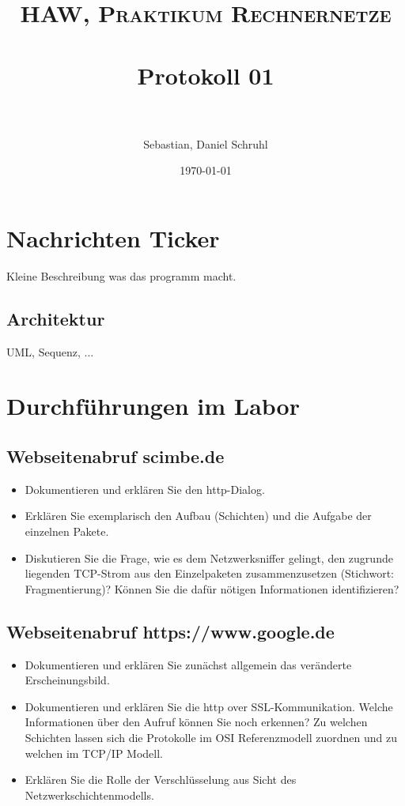 \documentclass[paper=a4, fontsize=11pt]{scrreprt}
\title{	
	\normalfont \normalsize 
	\textsc{HAW, Praktikum Rechnernetze} \\ [25pt] 
	\horrule{0.5pt} \\[0.4cm]
	\huge Protokoll 01 \\
	\horrule{2pt} \\[0.5cm]
}
\author{Sebastian, Daniel Schruhl}
\date{\normalsize\today}
\numberwithin{equation}{section}
\numberwithin{figure}{section}
\numberwithin{table}{section}
\begin{document}
\maketitle

\section{Nachrichten Ticker}

Kleine Beschreibung was das programm macht.

\subsection{Architektur}

UML, Sequenz, ...

\section{Durchführungen im Labor}

\subsection{Webseitenabruf scimbe.de}

\begin{itemize}
	\item Dokumentieren und erklären Sie den http-Dialog.
    \item Erklären Sie exemplarisch den Aufbau (Schichten) und die Aufgabe der einzelnen Pakete.
    \item Diskutieren Sie die Frage, wie es dem Netzwerksniffer gelingt, den zugrunde liegenden TCP-Strom aus den Einzelpaketen zusammenzusetzen (Stichwort: Fragmentierung)? Können Sie die dafür nötigen Informationen identifizieren?
\end{itemize}

\subsection{Webseitenabruf https://www.google.de}

\begin{itemize}
	\item Dokumentieren und erklären Sie zunächst allgemein das veränderte Erscheinungsbild.
	\item Dokumentieren und erklären Sie die http over SSL-Kommunikation. Welche Informationen über den
Aufruf können Sie noch erkennen? Zu welchen Schichten lassen sich die Protokolle im OSI
Referenzmodell zuordnen und zu welchen im TCP/IP Modell.
	\item Erklären Sie die Rolle der Verschlüsselung aus Sicht des Netzwerkschichtenmodells.
\end{itemize}
\end{document}
